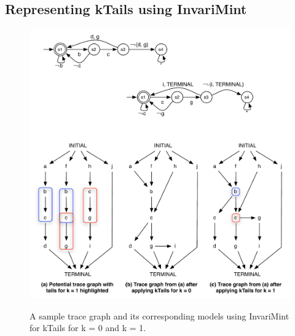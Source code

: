 \subsection{Representing kTails using InvariMint}


\begin{figure}
   \center
   {\includegraphics[width=0.95\columnwidth]{fig/ktails.pdf}}
   \caption{A sample trace graph and its corresponding models using
   InvariMint for kTails for k = 0 and k = 1.}
   \label{fig:ktails}
\end{figure}


